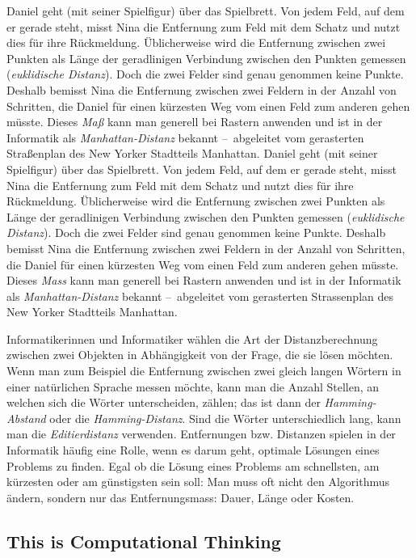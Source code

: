 \documentclass[a4paper,11pt]{report}
\begin{document}
Daniel geht (mit seiner Spielfigur) über das Spielbrett.  Von jedem Feld, auf dem er gerade steht, misst Nina die Entfernung zum Feld mit dem Schatz und nutzt dies für ihre Rückmeldung.  Üblicherweise wird die Entfernung zwischen zwei Punkten als Länge der geradlinigen Verbindung zwischen den Punkten gemessen (\emph{euklidische Distanz}).  Doch die zwei Felder sind genau genommen keine Punkte.  Deshalb bemisst Nina die Entfernung zwischen zwei Feldern in der Anzahl von Schritten, die Daniel für einen kürzesten Weg vom einen Feld zum anderen gehen müsste.  Dieses \emph{Maß} kann man generell bei Rastern anwenden und ist in der Informatik als \emph{Manhattan-Distanz} bekannt –~abgeleitet vom gerasterten Straßenplan des New Yorker Stadtteils Manhattan.
Daniel geht (mit seiner Spielfigur) über das Spielbrett.  Von jedem Feld, auf dem er gerade steht, misst Nina die Entfernung zum Feld mit dem Schatz und nutzt dies für ihre Rückmeldung.  Üblicherweise wird die Entfernung zwischen zwei Punkten als Länge der geradlinigen Verbindung zwischen den Punkten gemessen (\emph{euklidische Distanz}).  Doch die zwei Felder sind genau genommen keine Punkte.  Deshalb bemisst Nina die Entfernung zwischen zwei Feldern in der Anzahl von Schritten, die Daniel für einen kürzesten Weg vom einen Feld zum anderen gehen müsste.  Dieses \emph{Mass} kann man generell bei Rastern anwenden und ist in der Informatik als \emph{Manhattan-Distanz} bekannt –~abgeleitet vom gerasterten Strassenplan des New Yorker Stadtteils Manhattan.

Informatikerinnen und Informatiker wählen die Art der Distanzberechnung zwischen zwei Objekten in Abhängigkeit von der Frage, die sie lösen möchten. Wenn man zum Beispiel die Entfernung zwischen zwei gleich langen Wörtern in einer natürlichen Sprache messen möchte, kann man die Anzahl Stellen, an welchen sich die Wörter unterscheiden, zählen; das ist dann der  \emph{Hamming-Abstand} oder die \emph{Hamming-Distanz}.  Sind die Wörter unterschiedlich lang, kann man die \emph{Editierdistanz} verwenden. Entfernungen bzw. Distanzen spielen in der Informatik häufig eine Rolle, wenn es darum geht, optimale Lösungen eines Problems zu finden.  Egal ob die Lösung eines Problems am schnellsten, am kürzesten oder am günstigsten sein soll:  Man muss oft nicht den Algorithmus ändern, sondern nur das Entfernungsmass: Dauer, Länge oder Kosten.


\subsection*{This is Computational Thinking}
\end{document}
